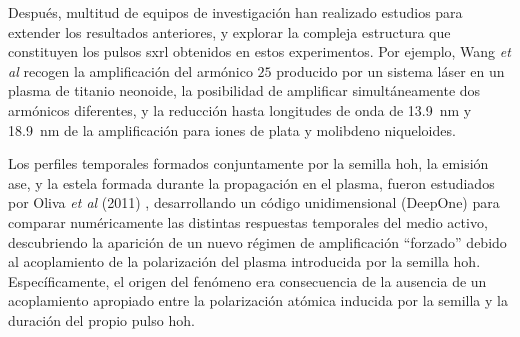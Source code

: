 Después, multitud de equipos de investigación han realizado estudios para extender los resultados anteriores, y explorar la compleja estructura que constituyen los pulsos \acrshort{sxrl} obtenidos en estos experimentos. Por ejemplo, Wang \emph{et al} \autocite{Wang2006,Wang2008,Wang2014} recogen la amplificación del armónico $25$ producido por un sistema láser  en un plasma de titanio neonoide, la posibilidad de amplificar simultáneamente dos armónicos diferentes, y la reducción hasta longitudes de onda de \qty{13.9}{nm} y \qty{18.9}{nm} de la amplificación para iones de plata y molibdeno niqueloides.

Los perfiles temporales formados conjuntamente por la semilla \acrshort{hoh}, la emisión \acrshort{ase}, y la estela formada durante la propagación en el plasma\autocite{Wang2008}, fueron estudiados por Oliva \emph{et al} (2011) \autocite{Oliva2011}, desarrollando un código unidimensional (DeepOne) para comparar numéricamente las distintas respuestas temporales del medio activo, descubriendo la aparición de un nuevo régimen de amplificación \enquote{forzado} debido al acoplamiento de la polarización del plasma introducida por la semilla \acrshort{hoh}. Específicamente, el origen del fenómeno \autocite{Almiev2007} era consecuencia de la ausencia de un acoplamiento apropiado entre la polarización atómica inducida por la semilla y la duración del propio pulso \acrshort{hoh}.





